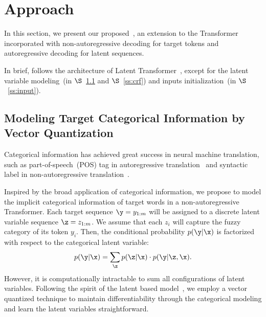 \section{Approach}
In this section, we present our proposed~\method, an extension to the Transformer incorporated with non-autoregressive decoding for target tokens and autoregressive decoding for latent sequences. 

In brief, \method follows the architecture of Latent Transformer~\cite{lt}, except for the latent variable modeling~(in $\S$~\ref{ss:vq} and $\S$~\ref{ss:crf}) and inputs initialization~(in $\S$~\ref{ss:input}). 




\subsection{Modeling Target Categorical Information by Vector Quantization}\label{ss:vq}
Categorical information has achieved great success in neural machine translation, such as part-of-speech~(POS) tag in autoregressive translation~\cite{latent_pos} and syntactic label in non-autoregressive translation~\cite{syn_st}.

Inspired by the broad application of categorical information, we propose to model the implicit categorical information of target words in a non-autoregressive Transformer. 
Each target sequence $\y=y_{1:m}$ will be assigned to a discrete latent variable sequence $\z = z_{1:m}$. 
We assume that each $z_i$ will capture the fuzzy category of its token $y_i$.
Then, the conditional probability $p(\y|\x)$ is factorized with respect to the categorical latent variable:
\begin{equation}\label{eqn:pos}
    p(\y|\x) = \sum_{\z} p(\z | \x) \cdot p(\y|\z,\x).
\end{equation}
However, it is computationally intractable to sum all configurations of latent variables. 
Following the spirit of the latent based model~\cite{lt,vqvae}, we employ a vector quantized technique to maintain differentiability through the categorical modeling and learn the latent variables straightforward.

